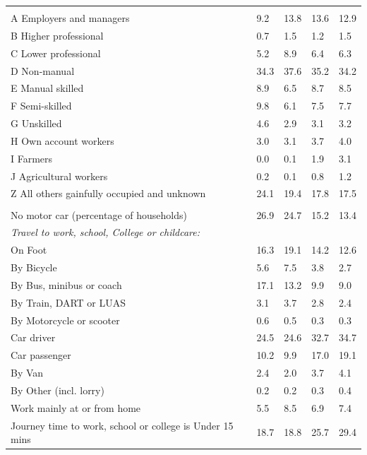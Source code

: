 \documentclass{article}
\begin{document}
\begin{table}[h]
\begin{tabular}{KTTTT}
\hline
    \\ 
    \hline
A Employers and managers &  9.2& 13.8& 13.6& 12.9\\
B Higher professional & 0.7& 1.5& 1.2& 1.5\\
C Lower professional & 5.2& 8.9& 6.4& 6.3\\
D Non-manual & 34.3& 37.6& 35.2& 34.2\\
E Manual skilled & 8.9& 6.5& 8.7& 8.5\\
F Semi-skilled & 9.8& 6.1& 7.5& 7.7\\
G Unskilled & 4.6& 2.9& 3.1& 3.2\\
H Own account workers & 3.0& 3.1& 3.7& 4.0\\
I Farmers & 0.0& 0.1& 1.9& 3.1\\
J Agricultural workers & 0.2& 0.1& 0.8& 1.2\\
Z All others gainfully occupied and unknown & 24.1& 19.4& 17.8& 17.5\\
\hline
{}\hline
    \\ 
    \hline
No motor car (percentage of households) & 26.9& 24.7& 15.2& 
13.4\\
    \hline 
\emph{Travel to work, school, College or childcare:} & & & \\
\quad On Foot & 16.3& 19.1& 14.2& 12.6\\ 
\quad By Bicycle & 5.6& 7.5& 3.8& 2.7\\ 
\quad By Bus, minibus or coach & 17.1& 13.2&  9.9&  9.0\\
\quad By Train, DART or LUAS & 3.1& 3.7& 2.8& 2.4\\
\quad By Motorcycle or scooter & 0.6& 0.5& 0.3& 0.3\\
\quad Car driver & 24.5 & 24.6& 32.7& 34.7\\
\quad Car passenger & 10.2&  9.9& 17.0& 19.1\\
\quad By Van & 2.4& 2.0& 3.7& 4.1\\
\quad By Other (incl. lorry) & 0.2& 0.2& 0.3& 0.4\\
    \hline
Work mainly at or from home & 5.5& 8.5& 6.9& 7.4\\
Journey time to work, school or college is Under 15 mins & 18.7& 18.8& 25.7& 29.4\\

\end{tabular}
\end{table}
\end{document}
